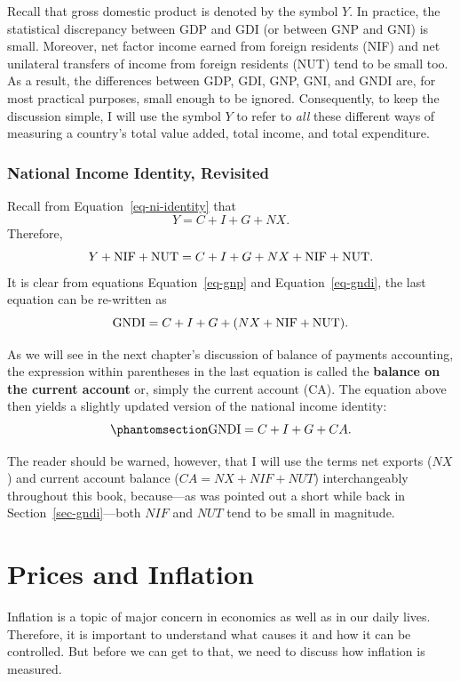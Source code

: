 \documentclass[
  letterpaper,
]{book}
\begin{document}
Recall that gross domestic product is denoted by the symbol \(Y\). In
practice, the statistical discrepancy between GDP and GDI (or between
GNP and GNI) is small. Moreover, net factor income earned from foreign
residents (NIF) and net unilateral transfers of income from foreign
residents (NUT) tend to be small too. As a result, the differences
between GDP, GDI, GNP, GNI, and GNDI are, for most practical purposes,
small enough to be ignored. Consequently, to keep the discussion simple,
I will use the symbol \(Y\) to refer to \emph{all} these different ways
of measuring a country's total value added, total income, and total
expenditure.

\subsubsection{National Income Identity, Revisited}\label{sec-nii-2}


Recall from Equation~\ref{eq-ni-identity} that \[ Y=C+I+G+NX.\]
Therefore, \[Y+\hbox{NIF}+\hbox{NUT}=C+I+G+NX+\hbox{NIF}+\hbox{NUT}.\]
It is clear from equations Equation~\ref{eq-gnp} and
Equation~\ref{eq-gndi}, the last equation can be re-written as \[
\hbox{GNDI}=C+I+G+(NX+\hbox{NIF}+\hbox{NUT}). 
\]

As we will see in the next chapter's discussion of balance of payments
accounting, the expression within parentheses in the last equation is
called the \textbf{balance on the current account} or, simply the
current account (CA). The equation above then yields a slightly updated
version of the national income identity:
\begin{equation}\phantomsection\label{eq-nii-ca}{
\hbox{GNDI}=C+I+G+CA.
}\end{equation}

The reader should be warned, however, that I will use the terms net
exports (\(NX\)) and current account balance (\(CA=NX+NIF+NUT\))
interchangeably throughout this book, because---as was pointed out a
short while back in Section~\ref{sec-gndi}---both \(NIF\) and \(NUT\)
tend to be small in magnitude.

\section{Prices and Inflation}\label{sec-p-pi}

Inflation is a topic of major concern in economics as well as in our
daily lives. Therefore, it is important to understand what causes it and
how it can be controlled. But before we can get to that, we need to
discuss how inflation is measured.
\end{document}
